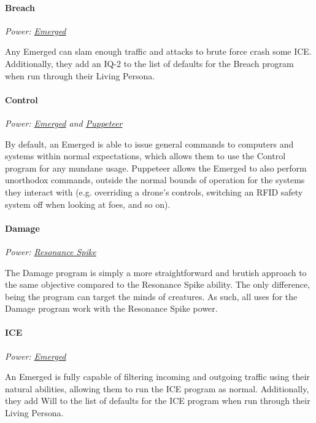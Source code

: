 \begin{multicols*}{3}
	\paragraph{Breach}
	\begin{center}
		\textit{Power: \hyperref[emerged]{Emerged}}
	\end{center}

	Any Emerged can slam enough traffic and attacks to brute force crash some ICE. Additionally, they add an IQ-2 to the list of defaults for the Breach program when run through their Living Persona.
	
	\paragraph{Control}
	\begin{center}
		\textit{Power: \hyperref[emerged]{Emerged} and \hyperref[puppeteer]{Puppeteer}}
	\end{center}

	By default, an Emerged is able to issue general commands to computers and systems within normal expectations, which allows them to use the Control program for any mundane usage. Puppeteer allows the Emerged to also perform unorthodox commands, outside the normal bounds of operation for the systems they interact with (e.g. overriding a drone's controls, switching an RFID safety system off when looking at foes, and so on).
	
	\paragraph{Damage}
	\begin{center}
		\textit{Power: \hyperref[resonance_spike]{Resonance Spike}}
	\end{center}

	The Damage program is simply a more straightforward and brutish approach to the same objective compared to the Resonance Spike ability. The only difference, being the program can target the minds of creatures. As such, all uses for the Damage program work with the Resonance Spike power.
	
	\paragraph{ICE}
	\begin{center}
		\textit{Power: \hyperref[emerged]{Emerged}}
	\end{center}

	An Emerged is fully capable of filtering incoming and outgoing traffic using their natural abilities, allowing them to run the ICE program as normal. Additionally, they add Will to the list of defaults for the ICE program when run through their Living Persona.
	

\end{multicols*}
